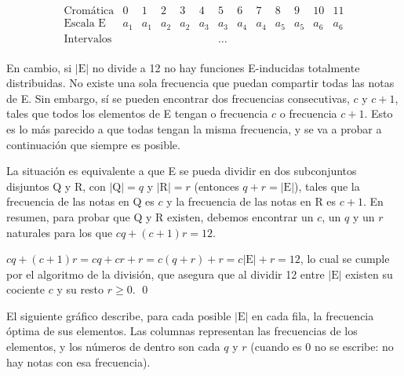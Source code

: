 		\[\left.\begin{matrix}
		\text{Cromática}&0&1&2&3&4&5&6&7&8&9&10&11\\
		\text{Escala E}&a_1&a_1&a_2&a_2&a_3&a_3&a_4&a_4&a_5&a_5&a_6&a_6\\
		\text{Intervalos}&&&&&&\ldots\\
		\end{matrix}\right.\]
		
		En cambio, si $|\text{E}|$ no divide a 12 no hay funciones E-inducidas totalmente distribuidas. No existe una sola frecuencia que puedan compartir todas las notas de E. Sin embargo, sí se pueden encontrar dos frecuencias consecutivas, $c$ y $c+1$, tales que todos los elementos de E tengan o frecuencia $c$ o frecuencia $c+1$. Esto es lo más parecido a que todas tengan la misma frecuencia, y se va a probar a continuación que siempre es posible. 
		
		La situación es equivalente a que E se pueda dividir en dos subconjuntos disjuntos Q y R, con $|\text{Q}|=q$ y $|\text{R}|=r$ (entonces $q+r=|\text{E}|$), tales que la frecuencia de las notas en Q es $c$ y la frecuencia de las notas en R es $c+1$. En resumen, para probar que Q y R existen, debemos encontrar un $c$, un $q$ y un $r$ naturales para los que $cq + (c+1)r=12$.
		
		$cq + (c+1)r =
		cq + cr + r =
		c(q+r) + r =
		c|\text{E}| + r = 12$, lo cual se cumple por el algoritmo de la división, que asegura que al dividir 12 entre $|\text{E}|$ existen su cociente $c$ y su resto $r\geq0$. \qed
		
		El siguiente gráfico describe, para cada posible $|\text{E}|$ en cada fila, la frecuencia óptima de sus elementos. Las columnas representan las frecuencias de los elementos, y los números de dentro son cada $q$ y $r$ (cuando es 0 no se escribe: no hay notas con esa frecuencia).
		
		
%			
%			
%			
	

